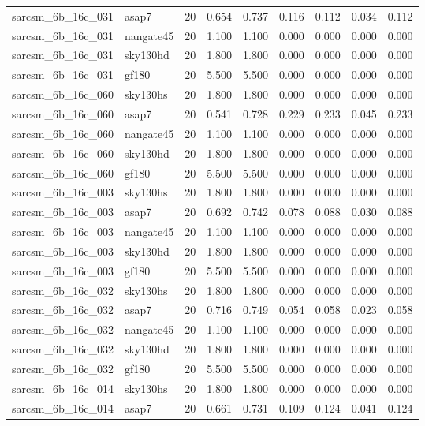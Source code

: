 \begin{tabular}{llrrrrrrr}
sarcsm\_6b\_16c\_031 & asap7 & 20 & 0.654 & 0.737 & 0.116 & 0.112 & 0.034 & 0.112 \\
sarcsm\_6b\_16c\_031 & nangate45 & 20 & 1.100 & 1.100 & 0.000 & 0.000 & 0.000 & 0.000 \\
sarcsm\_6b\_16c\_031 & sky130hd & 20 & 1.800 & 1.800 & 0.000 & 0.000 & 0.000 & 0.000 \\
sarcsm\_6b\_16c\_031 & gf180 & 20 & 5.500 & 5.500 & 0.000 & 0.000 & 0.000 & 0.000 \\
sarcsm\_6b\_16c\_060 & sky130hs & 20 & 1.800 & 1.800 & 0.000 & 0.000 & 0.000 & 0.000 \\
sarcsm\_6b\_16c\_060 & asap7 & 20 & 0.541 & 0.728 & 0.229 & 0.233 & 0.045 & 0.233 \\
sarcsm\_6b\_16c\_060 & nangate45 & 20 & 1.100 & 1.100 & 0.000 & 0.000 & 0.000 & 0.000 \\
sarcsm\_6b\_16c\_060 & sky130hd & 20 & 1.800 & 1.800 & 0.000 & 0.000 & 0.000 & 0.000 \\
sarcsm\_6b\_16c\_060 & gf180 & 20 & 5.500 & 5.500 & 0.000 & 0.000 & 0.000 & 0.000 \\
sarcsm\_6b\_16c\_003 & sky130hs & 20 & 1.800 & 1.800 & 0.000 & 0.000 & 0.000 & 0.000 \\
sarcsm\_6b\_16c\_003 & asap7 & 20 & 0.692 & 0.742 & 0.078 & 0.088 & 0.030 & 0.088 \\
sarcsm\_6b\_16c\_003 & nangate45 & 20 & 1.100 & 1.100 & 0.000 & 0.000 & 0.000 & 0.000 \\
sarcsm\_6b\_16c\_003 & sky130hd & 20 & 1.800 & 1.800 & 0.000 & 0.000 & 0.000 & 0.000 \\
sarcsm\_6b\_16c\_003 & gf180 & 20 & 5.500 & 5.500 & 0.000 & 0.000 & 0.000 & 0.000 \\
sarcsm\_6b\_16c\_032 & sky130hs & 20 & 1.800 & 1.800 & 0.000 & 0.000 & 0.000 & 0.000 \\
sarcsm\_6b\_16c\_032 & asap7 & 20 & 0.716 & 0.749 & 0.054 & 0.058 & 0.023 & 0.058 \\
sarcsm\_6b\_16c\_032 & nangate45 & 20 & 1.100 & 1.100 & 0.000 & 0.000 & 0.000 & 0.000 \\
sarcsm\_6b\_16c\_032 & sky130hd & 20 & 1.800 & 1.800 & 0.000 & 0.000 & 0.000 & 0.000 \\
sarcsm\_6b\_16c\_032 & gf180 & 20 & 5.500 & 5.500 & 0.000 & 0.000 & 0.000 & 0.000 \\
sarcsm\_6b\_16c\_014 & sky130hs & 20 & 1.800 & 1.800 & 0.000 & 0.000 & 0.000 & 0.000 \\
sarcsm\_6b\_16c\_014 & asap7 & 20 & 0.661 & 0.731 & 0.109 & 0.124 & 0.041 & 0.124 \\

\end{tabular}

